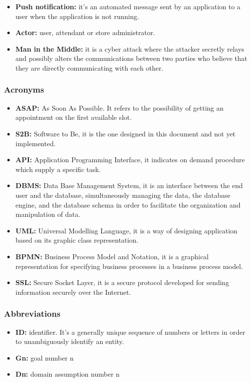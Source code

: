 \documentclass[table, 12pt]{article}
\begin{document}
\begin{flushleft}
\begin{itemize}
        \item \textbf{Push notification:} it's an automated message sent by an application to a user when the application is not running.
        \item \textbf{Actor:} user, attendant or store administrator.
        \item \textbf{Man in the Middle:} it is a cyber attack where the attacker secretly relays and possibly alters the communications between two parties who believe that they are directly communicating with each other.
    \end{itemize}
    \subsubsection{Acronyms}
    \begin{itemize}
        \item {\textbf{ASAP:} As Soon As Possible. It refers to the possibility of getting an appointment on the first available slot.}
        \item {\textbf{S2B:} Software to Be, it is the one designed in this document and not yet implemented.}
        \item {\textbf{API:} Application Programming Interface, it indicates on demand procedure which supply a specific task.}
        \item \textbf{DBMS:} Data Base Management System, it is an interface between the end user and the database, simultaneously managing the data, the database engine, and the database schema in order to facilitate the organization and manipulation of data.
        \item {\textbf{UML:} Universal Modelling Language, it is a way of designing application based on its graphic class representation.}
        \item \textbf{BPMN:} Business Process Model and Notation, it is a graphical representation for specifying business processes in a business process model.
        \item \textbf{SSL:} Secure Socket Layer, it is a secure protocol developed for sending information securely over the Internet.
    \end{itemize}
    \subsubsection{Abbreviations}
    \begin{itemize}
        \item {\textbf{ID:} identifier. It's a generally unique sequence of numbers or letters in order to unambiguously identify an entity.}
        \item {\textbf{Gn:} goal number n}
        \item \textbf{Dn:} domain assumption number n
    \end{itemize}

\end{flushleft}
\end{document}
